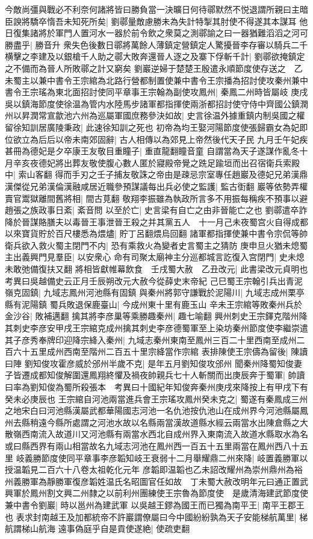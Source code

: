 今敵尚彊與戰必不利奈何諸將皆曰勝負當一決曠日何待鄩默然不悦退謂所親曰主暗臣諛將驕卒惰吾未知死所矣|{
	劉鄩量敵慮勝未為失計特掣其肘使不得遂其本謀耳}
他日復集諸將於軍門人置河水一器於前令飲之衆莫之測鄩諭之曰一器猶難滔滔之河可勝盡乎|{
	勝音升}
衆失色後數日鄩將萬餘人薄鎮定營鎮定人驚擾晉李存審以騎兵二千横擊之李建及以銀槍千人助之鄩大敗奔還晉人逐之及寨下俘斬千計|{
	劉鄩欲掩鎮定之不備而為晉人所敗鄩之計又窮矣}
劉巖逆婦于楚楚王殷遣永順節度使存送之　乙未蜀主以兼中書令王宗綰為北路行營都制置使兼中書令王宗播為招討使攻秦州兼中書令王宗瑤為東北面招討使同平章事王宗翰為副使攻鳳州|{
	秦鳳二州時皆屬岐}
庚戌吳以鎮海節度使徐温為管内水陸馬步諸軍都指揮使兩浙都招討使守侍中齊國公鎮潤州以昇潤常宣歙池六州為巡屬軍國庶務參決如故|{
	史言徐温外據重鎮内制吳國之權}
留徐知訓居廣陵秉政|{
	此速徐知訓之死也}
初帝為均王娶河陽節度使張歸霸女為妃即位欲立為后后以帝未南郊固辭|{
	古人相傳以為郊見上帝然後代天子民}
九月壬午妃疾甚冊為德妃是夕卒康王友敬目重瞳子|{
	重直龍翻瞳音童}
自謂當為天子遂謀作亂冬十月辛亥夜德妃將出葬友敬使腹心數人匿於寢殿帝覺之跣足踰垣而出召宿衛兵索殿中|{
	索山客翻}
得而手刃之壬子捕友敬誅之帝由是疎忌宗室專任趙巖及德妃兄弟漢鼎漢傑從兄弟漢倫漢融咸居近職參預謀議每出兵必使之監護|{
	監古衘翻}
巖等依勢弄權賣官鬻獄離間舊將相|{
	間古莧翻}
敬翔李振雖為執政所言多不用振每稱疾不預事以避趙張之族政事日紊|{
	紊音問}
以至於亡|{
	史言梁有自亡之由非晉能亡之也}
劉鄩遣卒詐降於晉謀賂膳夫以毒晉王事泄晉王殺之并其黨五人　十一月己未夜蜀宫火自得成都以來寶貨貯於百尺樓悉為煨燼|{
	貯丁呂翻煨烏回翻}
諸軍都指揮使兼中書令宗侃等帥衛兵欲入救火蜀主閉門不内|{
	恐有乘救火為變者史言蜀主之猜防}
庚申旦火猶未熄蜀主出義興門見羣臣|{
	以安衆心}
命有司聚太廟神主分巡都城言訖復入宫閉門|{
	史未熄未敢弛備復扶又翻}
將相皆獻帷幕飲食　壬戌蜀大赦　乙丑改元|{
	此書梁改元貞明也　考異曰吳越備史云正月壬辰朔改元大赦今從薛史末帝紀}
己巳蜀王宗翰引兵出青泥嶺克固鎮|{
	九域志鳳州河池縣有固鎮}
與秦州將郭守謙戰於泥陽川|{
	九域志成州栗亭縣有泥陽鎮}
蜀兵敗退保鹿臺山|{
	今成州東十里有鹿玉山}
辛未王宗綰等敗秦州兵於金沙谷|{
	敗補邁翻}
擒其將李彦巢等乘勝趣秦州|{
	趣七喻翻}
興州刺史王宗鐸克階州降其刺史李彦安甲戌王宗綰克成州擒其刺史李彦德蜀軍至上染坊秦州節度使李繼崇遣其子彦秀奉牌印迎降宗絳入秦州|{
	九域志秦州東南至鳳州三百二十里西南至成州二百六十五里成州西南至階州二百五十里宗絳當作宗綰}
表排陳使王宗儔為留後|{
	陳讀曰陣}
劉知俊攻霍彦威於邠州半歲不克|{
	是年五月劉知俊攻邠州}
聞秦州降蜀知俊妻子皆遷成都知俊解圍還鳳翔終懼及禍夜帥親兵七十人斬關而出庚辰奔于蜀軍|{
	帥讀曰率為劉知俊為蜀所殺張本　考異曰十國紀年知俊奔秦州庚戌來降按上有甲戌下有癸未必庚辰也}
王宗綰自河池兩當進兵會王宗瑤攻鳳州癸未克之|{
	蜀遂有秦鳳成三州之地宋白曰河池縣漢屬武都華陽國志河池一名仇池按仇池山在成州界今河池縣屬鳳州去縣稍遠今縣所處謂之河池水故以名縣兩當漢故道縣水經云兩當水出陳倉縣之大散嶺西南流入故道川又河池縣有兩當水西北自成州界入東南流入故道水縣取水為名或曰縣西界有兩山相當故名九域志河池在鳳州西一百五十五里兩當在鳳州西八十五里}
岐義勝節度使同平章事李彦韜知岐王衰弱十二月舉耀鼎二州來降|{
	岐置義勝軍以授温韜見二百六十八卷太祖乾化元年}
彦韜即温韜也乙未詔改耀州為崇州鼎州為裕州義勝軍為靜勝軍復彦韜姓温氏名昭圖官任如故　丁未蜀大赦改明年元曰通正置武興軍於鳳州割文興二州隸之以前利州團練使王宗魯為節度使　是歲清海建武節度使兼中書令劉巖|{
	時以邕州為建武軍}
以吳越王鏐為國王而已獨為南平王|{
	南平王郡王也}
表求封南越王及加都統帝不許巖謂僚屬曰今中國紛紛孰為天子安能梯航萬里|{
	梯航謂梯山航海}
遠事偽庭乎自是貢使遂絶|{
	使疏吏翻}


